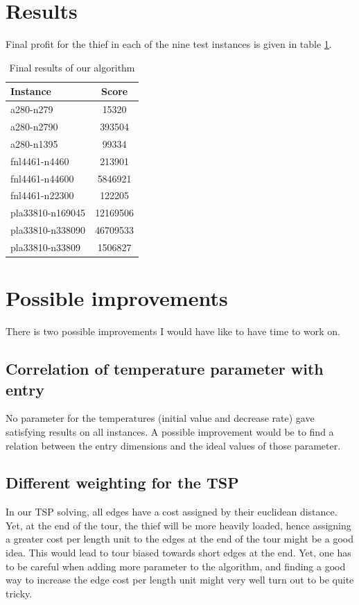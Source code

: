 \documentclass[fontsize=9pt,twocolumns,enabledeprecatedfontcommands]{scrartcl}
\begin{document}
\section{Results}

Final profit for the thief in each of the nine test instances is given in table \ref{table}.

\begin{table}[hbtp]
	\centering
\begin{tabular}{|l|c|}
	\hline 
	\textbf{Instance} & \textbf{Score}  \\ 
			\hline 
	a280-n279 & 15320 \\ 
		\hline 
	a280-n2790 & 393504 \\
	\hline 
	a280-n1395 & 99334 \\ 
	\hline 
		fnl4461-n4460 & 213901 \\ 
	\hline 
		fnl4461-n44600 & 5846921 \\ 
		\hline 
	fnl4461-n22300 & 122205 \\
	\hline
	pla33810-n169045 & 12169506\\
	\hline
	pla33810-n338090 & 46709533\\
	\hline
	pla33810-n33809 & 1506827\\
	\hline
\end{tabular}
\caption{Final results of our algorithm \label{table}} 
\end{table}
\section{Possible improvements}
There is two possible improvements I would have like to have time to work on.
\subsection{Correlation of temperature parameter with entry}
No parameter for the temperatures (initial value and decrease rate) gave satisfying results on all instances. A possible improvement would be to find a relation between the entry dimensions and the ideal values of those parameter.
\subsection{Different weighting for the TSP}
In our TSP solving, all edges have a cost assigned by their euclidean distance. Yet, at the end of the tour, the thief will be more heavily loaded, hence assigning a greater cost per length unit to the edges at the end of the tour might be a good idea. This would lead to tour biased towards short edges at the end. Yet, one has to be careful when adding more parameter to the algorithm, and finding a good way to increase the edge cost per length unit might very well turn out to be quite tricky.


\end{document}
